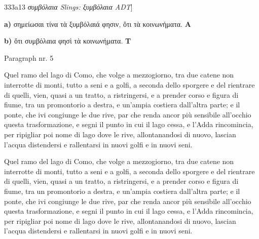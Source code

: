 \documentclass[b5paper]{book}
\begin{document}
\resumenumbering
\numberpstarttrue

\pstart {}333a13 \textit{συμβόλαια Slings: ξυμβόλαια ADT}]\pend


\pausenumbering
\begin{pairs}
\begin{Leftside}
\resumenumbering
\numberpstartfalse
    \pstart\noindent \textbf{a)} σημείωσαι τίνα τὰ ξυμβόλαιά φησιν, ὅτι τὰ κοινωνήματα. \textbf{A}\pend
\pausenumbering
\end{Leftside}

\begin{Rightside}
\resumenumbering
\numberpstartfalse
    \pstart\noindent \textbf{b)} ὅτι συμβόλαια φησὶ τὰ κοινωνήματα. \textbf{T}\pend
\pausenumbering
\end{Rightside}
\end{pairs}
\Columns

\numberpstarttrue
\resumenumbering

\pstart%
    Paragraph nr. 5%
\pend


\pausenumbering
\begin{pairs}
\begin{Leftside}
\resumenumbering
\numberpstartfalse
    \pstart
    Quel ramo del lago di Como, che volge a mezzogiorno, tra due catene non interrotte di monti, tutto a seni e a golfi, a seconda dello sporgere e del rientrare di quelli, vien, quasi a un tratto, a ristringersi, e a prender corso e figura di fiume, tra un promontorio a destra, e un'ampia costiera dall'altra parte; e il ponte, che ivi congiunge le due rive, par che renda ancor più sensibile all'occhio questa trasformazione, e segni il punto in cui il lago cessa, e l'Adda rincomincia, per ripigliar poi nome di lago dove le rive, allontanandosi di nuovo, lascian l'acqua distendersi e rallentarsi in nuovi golfi e in nuovi seni.
    \pend
\pausenumbering
\end{Leftside}

\begin{Rightside}
\resumenumbering
\numberpstartfalse
    \pstart
    Quel ramo del lago di Como, che volge a mezzogiorno, tra due catene non interrotte di monti, tutto a seni e a golfi, a seconda dello sporgere e del rientrare di quelli, vien, quasi a un tratto, a ristringersi, e a prender corso e figura di fiume, tra un promontorio a destra, e un'ampia costiera dall'altra parte; e il ponte, che ivi congiunge le due rive, par che renda ancor più sensibile all'occhio questa trasformazione, e segni il punto in cui il lago cessa, e l'Adda rincomincia, per ripigliar poi nome di lago dove le rive, allontanandosi di nuovo, lascian l'acqua distendersi e rallentarsi in nuovi golfi e in nuovi seni.
    \pend
\pausenumbering
\end{Rightside}
\end{pairs}
\Columns
\end{document}
